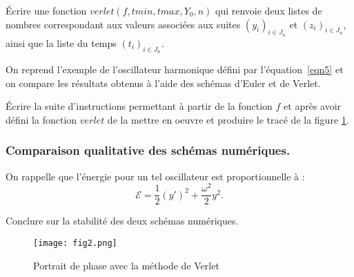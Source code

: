 \question{}
Écrire une fonction $verlet(f, tmin, tmax, Y_0, n)$ qui renvoie deux listes de nombres correspondant aux valeurs associées aux suites $\left(y_i\right)_{i\in J_n}$ et $\left(z_i\right)_{i\in J_n}$, ainsi que la liste du temps $\left(t_i\right)_{i\in J_n}$.

\bigskip

On reprend l'exemple de l'oscillateur harmonique défini par l'équation~\eqref{eqn5} et on compare les résultats obtenus à l'aide des schémas d'Euler et de Verlet.


\question{} \'Ecrire la suite d'instructions permettant à partir de la fonction $f$ et après avoir défini la fonction $verlet$ de la mettre en oeuvre et produire le tracé de la figure \ref{fig2}. 

\subsubsection*{Comparaison qualitative des schémas numériques.}

On rappelle que l'énergie pour un tel oscillateur est proportionnelle à : 
\begin{equation*}
  \mathcal{E} = \dfrac{1}{2}(y')^2 + \dfrac{\omega^2}{2}y^2.
\end{equation*}

\question{} Conclure sur la stabilité des deux schémas numériques.

\begin{figure}[!h]
\begin{center}
\texttt{[image: fig2.png]}
\caption{Portrait de phase avec la méthode de Verlet\label{fig2}}
\end{center}
\end{figure}